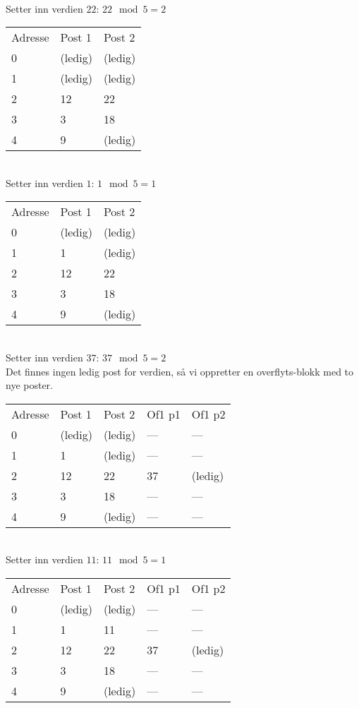 \documentclass[a4paper, 12pt] {article}
\begin{document}
~\\
Setter inn verdien $22$: $22 \mod 5 = 2$\\
\begin{tabular}{|l|l|l|}
    \hline
    Adresse & Post 1 & Post 2 \\
    0       & (ledig)& (ledig)\\
    1       & (ledig)& (ledig)\\
    2       & 12     & 22     \\
    3       & 3      & 18     \\
    4       & 9      & (ledig)\\ \hline
\end{tabular}

~\\
Setter inn verdien $1$: $1 \mod 5 = 1$\\
\begin{tabular}{|l|l|l|}
    \hline
    Adresse & Post 1 & Post 2 \\
    0       & (ledig)& (ledig)\\
    1       & 1      & (ledig)\\
    2       & 12     & 22     \\
    3       & 3      & 18     \\
    4       & 9      & (ledig)\\ \hline
\end{tabular}

~\\
Setter inn verdien $37$: $37 \mod 5 = 2$\\
Det finnes ingen ledig post for verdien, så vi oppretter en overflyts-blokk med to nye poster.\\
\begin{tabular}{|l|l|l|l|l|}
    \hline
    Adresse & Post 1 & Post 2 & Of1 p1 & Of1 p2 \\
    0       & (ledig)& (ledig)& ---   & ---   \\
    1       & 1      & (ledig)& ---   & ---   \\
    2       & 12     & 22     & 37     & (ledig)\\
    3       & 3      & 18     & ---   & ---   \\
    4       & 9      & (ledig)& ---   & ---   \\ \hline
\end{tabular}

~\\
Setter inn verdien $11$: $11 \mod 5 = 1$\\
\begin{tabular}{|l|l|l|l|l|}
    \hline
    Adresse & Post 1 & Post 2 & Of1 p1 & Of1 p2 \\
    0       & (ledig)& (ledig)& ---   & ---   \\
    1       & 1      & 11     & ---   & ---   \\
    2       & 12     & 22     & 37     & (ledig)\\
    3       & 3      & 18     & ---   & ---   \\
    4       & 9      & (ledig)& ---   & ---   \\ \hline
\end{tabular}
\end{document}
